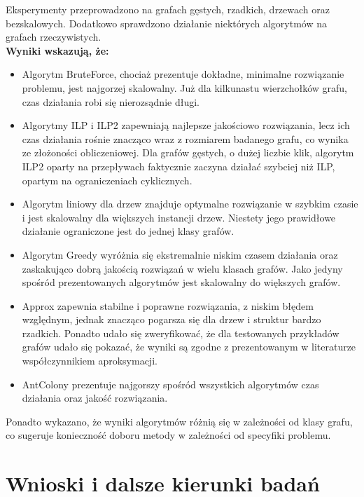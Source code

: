 Eksperymenty przeprowadzono na grafach gęstych, rzadkich, drzewach oraz bezskalowych. Dodatkowo sprawdzono działanie niektórych algorytmów na grafach rzeczywistych. \\
\textbf{Wyniki wskazują, że:}
\begin{itemize}
    \item Algorytm BruteForce, chociaż prezentuje dokładne, minimalne rozwiązanie problemu, jest najgorzej skalowalny. Już dla kilkunastu wierzchołków grafu, czas działania robi się nierozsądnie długi.
    \item Algorytmy ILP i ILP2 zapewniają najlepsze jakościowo rozwiązania, lecz ich czas działania rośnie znacząco wraz z rozmiarem badanego grafu, co wynika ze złożoności obliczeniowej. Dla grafów gęstych, o dużej liczbie klik, algorytm ILP2 oparty na przepływach faktycznie zaczyna działać szybciej niż ILP, opartym na ograniczeniach cyklicznych.
    \item Algorytm liniowy dla drzew znajduje optymalne rozwiązanie w szybkim czasie i jest skalowalny dla większych instancji drzew. Niestety jego prawidłowe działanie ograniczone jest do jednej klasy grafów.
    \item Algorytm Greedy wyróżnia się ekstremalnie niskim czasem działania oraz zaskakująco dobrą jakością rozwiązań w wielu klasach grafów. Jako jedyny spośród prezentowanych algorytmów jest skalowalny do większych grafów.
    \item Approx zapewnia stabilne i poprawne rozwiązania, z niskim błędem względnym, jednak znacząco pogarsza się dla drzew i struktur bardzo rzadkich. Ponadto udało się zweryfikować, że dla testowanych przykładów grafów udało się pokazać, że wyniki są zgodne z prezentowanym w literaturze współczynnikiem aproksymacji.
    \item AntColony prezentuje najgorszy spośród wszystkich algorytmów czas działania oraz jakość rozwiązania.
\end{itemize}

Ponadto wykazano, że wyniki algorytmów różnią się w zależności od klasy grafu, co sugeruje konieczność doboru metody w zależności od specyfiki problemu.

\section{Wnioski i dalsze kierunki badań}

